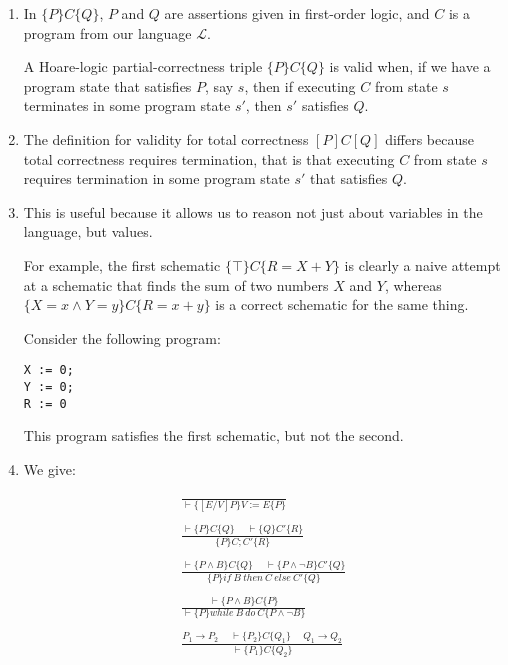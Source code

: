 

\usepackage{bussproofs}


\begin{enumerate}[label=(\alph*)]

  \item
    In $\{P\}C\{Q\}$, $P$ and $Q$ are assertions given in first-order logic, and $C$ is a program from our language $\mathcal{L}$.

    A Hoare-logic partial-correctness triple $\{P\}C\{Q\}$ is valid when, if we have a program state that satisfies $P$, say $s$, then if executing $C$ from state $s$ terminates in some program state $s'$, then $s'$ satisfies $Q$.

  \item
    The definition for validity for total correctness $[P]C[Q]$ differs because total correctness requires termination, that is that executing $C$ from state $s$ requires termination in some program state $s'$ that satisfies $Q$.

  \item
    This is useful because it allows us to reason not just about variables in the language, but values.

    For example, the first schematic $\{\top\}C\{R = X + Y\}$ is clearly a naive attempt at a schematic that finds the sum of two numbers $X$ and $Y$, whereas $\{X=x \wedge Y=y\}C\{R = x+y\}$ is a correct schematic for the same thing.

    Consider the following program:

\begin{verbatim}
X := 0;
Y := 0;
R := 0
\end{verbatim}

This program satisfies the first schematic, but not the second.

\item

  We give:

  \begin{align*}
    \frac{}{\vdash \{[E / V]P\} V := E \{P\}}\\
    \\
    \frac{\vdash \{P\}C\{Q\} \hspace{15pt} \vdash \{Q\}C'\{R\}}{\{P\}C;C'\{R\}}\\
    \\
    \frac{\vdash \{P \wedge B\}C\{Q\} \hspace{15pt} \vdash \{P \wedge \neg B\}C'\{Q\}}{\{P\}if\ B\ then\ C\ else\ C'\{Q\}}\\
    \\
    \frac{\vdash \{P \wedge B\}C\{P\}}{\vdash \{P\}while\ B\ do\ C\{P \wedge \neg B\}}\\
    \\
    \frac{P_1 \rightarrow P_2 \hspace{15pt}\vdash \{P_2\}C\{Q_1\} \hspace{15pt} Q_1 \rightarrow Q_2}{\vdash \{P_1\}C\{Q_2\}}
  \end{align*}


\end{enumerate}
